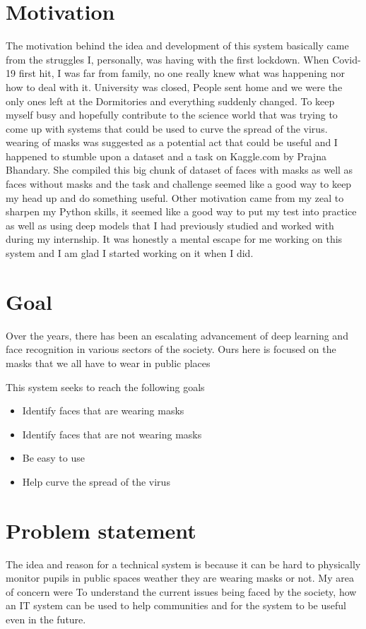 \section{Motivation}
The motivation behind the idea and development of this system basically came from the struggles I, personally, was having with the first lockdown. When Covid-19 first hit, I was far from family, no one really knew what was happening nor how to deal with it. University was closed, People sent home and we were the only ones left at the Dormitories and everything suddenly changed. To keep myself busy and hopefully contribute to the science world that was trying to come up with systems that could be used to curve the spread of the virus. wearing of masks was suggested as a potential act that could be useful and I happened to stumble upon a dataset and a task on Kaggle.com by Prajna Bhandary. She compiled this big chunk of dataset of faces with masks as well as faces without masks and the task and challenge seemed like a good way to keep my head up and do something useful. Other motivation came from my zeal to sharpen my Python skills, it seemed like a good way to put my test into practice as well as using deep models that I had previously studied and worked with during my internship. It was honestly a mental escape for me working on this system and I am glad I started working on it when I did.

\section{Goal}
Over the years, there has been an escalating advancement of deep learning and face recognition in various sectors of the society. Ours here is focused on the masks that we all have to wear in public places

This system seeks to reach the following goals 
\begin{itemize}
    \item Identify faces that are wearing masks
    \item Identify faces that are not wearing masks
    \item Be easy to use
    \item Help curve the spread of the virus
\end{itemize}

\section{Problem statement}

The idea and reason for a technical system is because it can be hard to physically monitor pupils in public spaces weather they are wearing masks or not. My area of concern were To understand the current issues being faced by the society, how an IT system can be used to help communities and for the system to be useful even in the future.